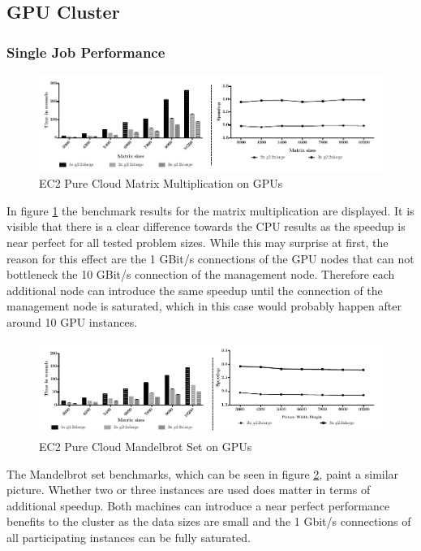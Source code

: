 \subsection{GPU Cluster}
\subsubsection*{Single Job Performance}

\begin{figure}[H]	
	\includegraphics[width=1.0\textwidth]{images/ec2_gpu_matrix_multiplication.pdf}
	\centering
	\caption{EC2 Pure Cloud Matrix Multiplication on GPUs}
	\label{img:ec2_gpu_matrix_multiplication}
\end{figure}

In figure \ref{img:ec2_gpu_matrix_multiplication} the benchmark results for the matrix multiplication are displayed. It is visible that there is a clear difference towards the CPU results as the speedup is near perfect for all tested problem sizes. While this may surprise at first, the reason for this effect are the 1 GBit/s connections of the GPU nodes that can not bottleneck the 10 GBit/s connection of the management node. Therefore each additional node can introduce the same speedup until the connection of the management node is saturated, which in this case would probably happen after around 10 GPU instances.

\begin{figure}[H]	
	\includegraphics[width=1.0\textwidth]{images/ec2_gpu_mandelbrot.pdf}
	\centering
	\caption{EC2 Pure Cloud Mandelbrot Set on GPUs}
	\label{img:ec2_gpu_mandelbrot}
\end{figure}

The Mandelbrot set benchmarks, which can be seen in figure \ref{img:ec2_gpu_mandelbrot}, paint a similar picture. Whether two or three instances are used does matter in terms of additional speedup. Both machines can introduce a near perfect performance benefits to the cluster as the data sizes are small and the 1 Gbit/s connections of all participating instances can be fully saturated.

